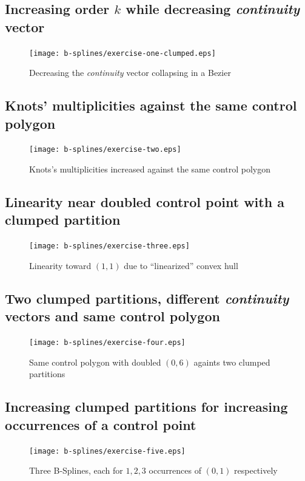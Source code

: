 \documentclass{article}
\begin{document}
\subsection{Increasing order $k$ while decreasing \emph{continuity} vector }
\begin{figure}
  \centering
  \texttt{[image: b-splines/exercise-one-clumped.eps]}
  \caption{Decreasing the \emph{continuity} vector collapsing in a Bezier }
  \label{fig:bspline-exercise-one-clumped}
\end{figure}

\subsection{Knots' multiplicities against the same control polygon}
\begin{figure}
  \centering
  \texttt{[image: b-splines/exercise-two.eps]}
  \caption{Knots's multiplicities increased against the same control polygon }
  \label{fig:bspline-exercise-two}
\end{figure}

\subsection{Linearity near doubled control point with a clumped partition}
\begin{figure}
  \centering
  \texttt{[image: b-splines/exercise-three.eps]}
  \caption{Linearity toward $(1,1)$ due to ``linearized'' convex hull}
  \label{fig:bspline-exercise-three}
\end{figure}

\subsection{Two clumped partitions, different \emph{continuity} vectors and same control polygon}
\begin{figure}
  \centering
  \texttt{[image: b-splines/exercise-four.eps]}
  \caption{Same control polygon with doubled $(0,6)$ againts two clumped partitions}
  \label{fig:bspline-exercise-four}
\end{figure}

\subsection{Increasing clumped partitions for increasing occurrences of a control point}
\begin{figure}
  \centering
  \texttt{[image: b-splines/exercise-five.eps]}
  \caption{Three B-Splines, each for $1,2,3$ occurrences of $(0,1)$ respectively }
  \label{fig:bspline-exercise-five}
\end{figure}
\end{document}
